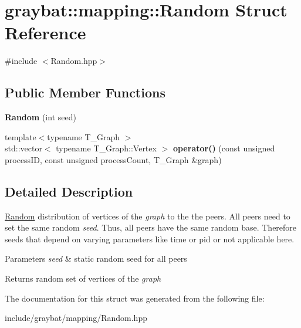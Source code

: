 \hypertarget{structgraybat_1_1mapping_1_1Random}{}\section{graybat\+:\+:mapping\+:\+:Random Struct Reference}
\label{structgraybat_1_1mapping_1_1Random}


{\ttfamily \#include $<$Random.\+hpp$>$}

\subsection*{Public Member Functions}
\begin{DoxyCompactItemize}
\item 
\hypertarget{structgraybat_1_1mapping_1_1Random_aa312e299c06353a14462903718bbd4d2}{}{\bfseries Random} (int seed)\label{structgraybat_1_1mapping_1_1Random_aa312e299c06353a14462903718bbd4d2}

\item 
\hypertarget{structgraybat_1_1mapping_1_1Random_ac605dc1800492f611545fcc80a9767f5}{}{\footnotesize template$<$typename T\+\_\+\+Graph $>$ }\\std\+::vector$<$ typename T\+\_\+\+Graph\+::\+Vertex $>$ {\bfseries operator()} (const unsigned process\+I\+D, const unsigned process\+Count, T\+\_\+\+Graph \&graph)\label{structgraybat_1_1mapping_1_1Random_ac605dc1800492f611545fcc80a9767f5}

\end{DoxyCompactItemize}


\subsection{Detailed Description}
\hyperlink{structgraybat_1_1mapping_1_1Random}{Random} distribution of vertices of the {\itshape graph} to the the peers. All peers need to set the same random {\itshape seed}. Thus, all peers have the same random base. Therefore seeds that depend on varying parameters like time or pid or not applicable here.


\begin{DoxyParams}{Parameters}
{\em seed} & static random seed for all peers \\
\hline
\end{DoxyParams}
\begin{DoxyReturn}{Returns}
random set of vertices of the {\itshape graph} 
\end{DoxyReturn}


The documentation for this struct was generated from the following file\+:\begin{DoxyCompactItemize}
\item 
include/graybat/mapping/Random.\+hpp\end{DoxyCompactItemize}
